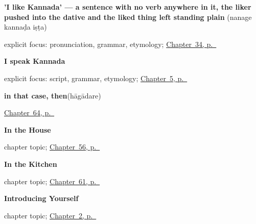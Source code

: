 \noindent\begin{minipage}[t]{\linewidth}
\raggedright
\textbf{'I like Kannada' — a sentence with no verb anywhere in it, the liker pushed into the dative and the liked thing left standing plain}\enspace\emph{  }\enspace(nanage kannaḍa iṣṭa)\par
\footnotesize explicit focus: pronunciation, grammar, etymology; \hyperref[ch:ka-social-verbs]{Chapter~34, p.~\pageref*{ch:ka-social-verbs}}
\end{minipage}\par\smallskip

\noindent\begin{minipage}[t]{\linewidth}
\raggedright
\textbf{I speak Kannada}\enspace\emph{  }\par
\footnotesize explicit focus: script, grammar, etymology; \hyperref[ch:first-verbs]{Chapter~5, p.~\pageref*{ch:first-verbs}}
\end{minipage}\par\smallskip

\noindent\begin{minipage}[t]{\linewidth}
\raggedright
\textbf{in that case, then}\enspace\emph{}\enspace(hāgādare)\par
\footnotesize \hyperref[ch:ka-joining]{Chapter~64, p.~\pageref*{ch:ka-joining}}
\end{minipage}\par\smallskip

\noindent\begin{minipage}[t]{\linewidth}
\raggedright
\textbf{In the House}\par
\footnotesize chapter topic; \hyperref[ch:ka-house]{Chapter~56, p.~\pageref*{ch:ka-house}}
\end{minipage}\par\smallskip

\noindent\begin{minipage}[t]{\linewidth}
\raggedright
\textbf{In the Kitchen}\par
\footnotesize chapter topic; \hyperref[ch:ka-kitchen]{Chapter~61, p.~\pageref*{ch:ka-kitchen}}
\end{minipage}\par\smallskip

\noindent\begin{minipage}[t]{\linewidth}
\raggedright
\textbf{Introducing Yourself}\par
\footnotesize chapter topic; \hyperref[ch:introductions]{Chapter~2, p.~\pageref*{ch:introductions}}
\end{minipage}\par\smallskip

